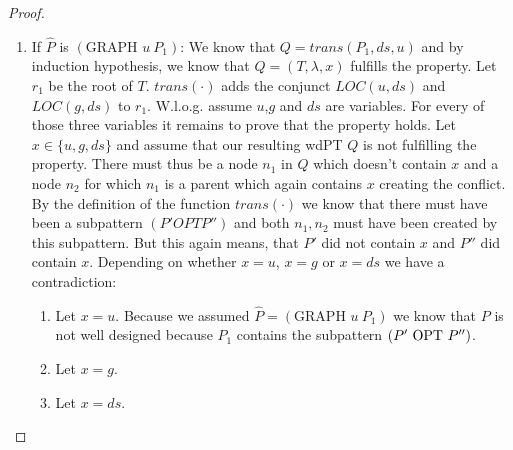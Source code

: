 \begin{proof}
\begin{enumerate}
\begin{enumerate}
				\item If $\hat{P}$ is $(\mbox{GRAPH }  u \ P_1)$:
					We know that $Q = trans(P_1,ds,u)$ and by induction hypothesis,
					we know that $Q = (T, \lambda,x)$ fulfills the property. Let
					$r_1$ be the root of $T$. $trans(\cdot)$ adds the conjunct
					$LOC(u,ds)$ and $LOC(g,ds)$ to $r_1$. W.l.o.g. assume $u$,$g$
					and $ds$ are variables. For every of those three variables it
					remains to prove that the property holds.
					Let $x \in \{u,g,ds\}$ and assume that our resulting wdPT $Q$ is
					not fulfilling the property. There must thus be a node $n_1$ in $Q$ which
					doesn't contain $x$ and a node $n_2$ for which $n_1$ is a parent 
					which again contains $x$ creating the conflict.
					By the definition of the function $trans(\cdot)$ we know that
					there must have been a subpattern $(P' OPT P'')$ and both $n_1,n_2$ must
					have been created by this subpattern. But this again means, that
					$P'$ did not contain $x$ and $P''$ did contain $x$. 
					Depending on whether $x = u$, $x=g$ or $x=ds$ we have a
					contradiction:
					\begin{enumerate}
						\item Let $x=u$. Because we assumed $\hat{P}=
							(\mbox{GRAPH } u \ P_1)$ we know that
							$P$ is not well designed because $P_1$ contains the
							subpattern $(P' \mbox{ OPT } P'')$.
						\item Let $x = g$. 
						\item Let $x = ds$.
					\end{enumerate}




\end{enumerate}
\end{enumerate}
\end{proof}
